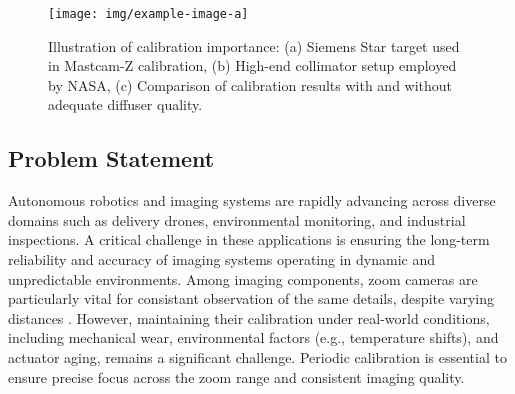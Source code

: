 \documentclass[main]{subfiles}
\begin{document}
\begin{figure}[ht]
    \centering
    \texttt{[image: img/example-image-a]} %
    \caption{Illustration of calibration importance: (a) Siemens Star target used in Mastcam-Z calibration,
    (b) High-end collimator setup employed by NASA,
    (c) Comparison of calibration results with and without adequate diffuser quality.}
    \label{fig:calibration_collage}
\end{figure}




\subsection{Problem Statement}


  Autonomous robotics and imaging systems are rapidly advancing across diverse domains such as delivery drones, environmental monitoring, and industrial inspections. A critical challenge in these applications is ensuring the long-term reliability and accuracy of imaging systems operating in dynamic and unpredictable environments. Among imaging components, zoom cameras are particularly vital for consistant observation of the same details, despite varying distances \cite{Atienza2001APZ}. However, maintaining their calibration under real-world conditions, including mechanical wear, environmental factors (e.g., temperature shifts), and actuator aging, remains a significant challenge. Periodic calibration is essential to ensure precise focus across the zoom range and consistent imaging quality.
\end{document}
